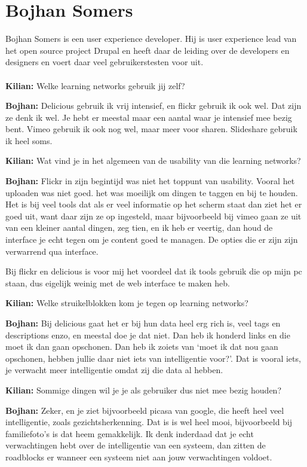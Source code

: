 \section{Bojhan Somers}
Bojhan Somers is een user experience developer. Hij is user experience lead van het open source project Drupal en heeft daar de leiding over de developers en designers en voert daar veel gebruikerstesten voor uit.

\paragraph{}
\textbf{Kilian:} Welke learning networks gebruik jij zelf?

\textbf{Bojhan:} Delicious gebruik ik vrij intensief, en flickr gebruik ik ook wel. Dat zijn ze denk ik wel. Je hebt er meestal maar een aantal waar je intensief mee bezig bent. Vimeo gebruik ik ook nog wel, maar meer voor sharen. Slideshare gebruik ik heel soms.

\textbf{Kilian:} Wat vind je in het algemeen van de usability van die learning networks?

\textbf{Bojhan:} Flickr in zijn begintijd was niet het toppunt van usability. Vooral het uploaden was niet goed. het was moeilijk om dingen te taggen en bij te houden. Het is bij veel tools dat als er veel informatie op het scherm staat dan ziet het er goed uit, want daar zijn ze op ingesteld, maar bijvoorbeeld bij vimeo gaan ze uit van een kleiner aantal dingen, zeg tien, en ik heb er veertig, dan houd de interface je echt tegen om je content goed te managen. De opties die er zijn zijn verwarrend qua interface.

Bij flickr en delicious is voor mij het voordeel dat ik tools gebruik die op mijn pc staan, dus eigelijk weinig met de web interface te maken heb.

\textbf{Kilian:} Welke struikelblokken kom je tegen op learning networks?

\textbf{Bojhan:} Bij delicious gaat het er bij hun data heel erg rich is, veel tags en descriptions enzo, en meestal doe je dat niet. Dan heb ik honderd links en die moet ik dan gaan opschonen. Dan heb ik zoiets van `moet ik dat nou gaan opschonen, hebben jullie daar niet iets van intelligentie voor?'. Dat is vooral iets, je verwacht meer intelligentie omdat zij die data al hebben.

\textbf{Kilian:} Sommige dingen wil je je als gebruiker dus niet mee bezig houden?

\textbf{Bojhan:} Zeker, en je ziet bijvoorbeeld picasa van google, die heeft heel veel intelligentie, zoals gezichtsherkenning. Dat is is wel heel mooi, bijvoorbeeld bij familiefoto's is dat heem gemakkelijk. Ik denk inderdaad dat je echt verwachtingen hebt over de intelligentie van een systeem, dan zitten de roadblocks er wanneer een systeem niet aan jouw verwachtingen voldoet.

